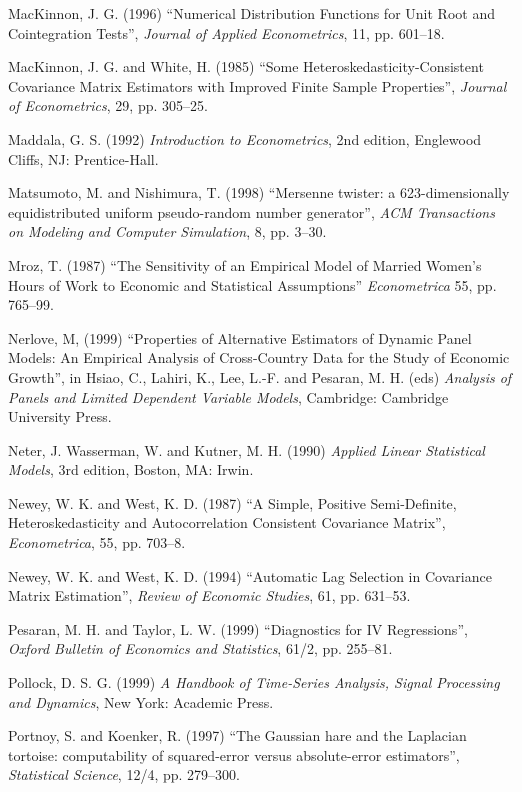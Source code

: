 \begin{thebibliography}
  MacKinnon, J. G. (1996) ``Numerical Distribution Functions for Unit
  Root and Cointegration Tests'', \emph{Journal of Applied
    Econometrics}, 11, pp. 601--18.
  
  MacKinnon, J. G. and White, H.  (1985) ``Some
  Heteroskedasticity-Consistent Covariance Matrix Estimators with
  Improved Finite Sample Properties'', \emph{Journal of Econometrics},
  29, pp. 305--25.
  
  Maddala, G. S. (1992) \emph{Introduction to Econometrics}, 2nd
  edition, Englewood Cliffs, NJ: Prentice-Hall.
  
  Matsumoto, M. and Nishimura, T.  (1998) ``Mersenne twister: a
  623-dimensionally equidistributed uniform pseudo-random number
  generator'', \emph{ACM Transactions on Modeling and Computer
    Simulation}, 8, pp. 3--30.

  Mroz, T. (1987) ``The Sensitivity of an Empirical Model of Married
  Women's Hours of Work to Economic and Statistical Assumptions''
  \emph{Econometrica} 55, pp. 765--99.

  Nerlove, M, (1999) ``Properties of Alternative Estimators of Dynamic
  Panel Models: An Empirical Analysis of Cross-Country Data for the
  Study of Economic Growth'', in Hsiao, C., Lahiri, K., Lee, L.-F. and
  Pesaran, M. H. (eds) \emph{Analysis of Panels and Limited Dependent
    Variable Models}, Cambridge: Cambridge University Press.
    
  Neter, J. Wasserman, W. and Kutner, M. H. (1990) \emph{Applied
    Linear Statistical Models}, 3rd edition, Boston, MA: Irwin.

  Newey, W. K. and West, K. D. (1987) ``A Simple, Positive
  Semi-Definite, Heteroskedasticity and Autocorrelation Consistent
  Covariance Matrix'', \emph{Econometrica}, 55, pp. 703--8.

  Newey, W. K. and West, K. D. (1994) ``Automatic Lag Selection in
  Covariance Matrix Estimation'', \emph{Review of Economic Studies},
  61, pp. 631--53.

  Pesaran, M. H. and Taylor, L. W. (1999) ``Diagnostics for IV
  Regressions'', \emph{Oxford Bulletin of Economics and Statistics},
  61/2, pp. 255--81.

  Pollock, D. S. G. (1999) \emph{A Handbook of Time-Series Analysis,
    Signal Processing and Dynamics}, New York: Academic Press.

  Portnoy, S. and Koenker, R. (1997) ``The Gaussian hare and the
  Laplacian tortoise: computability of squared-error versus
  absolute-error estimators'', \emph{Statistical Science}, 12/4,
  pp. 279--300.
  

\end{thebibliography}
